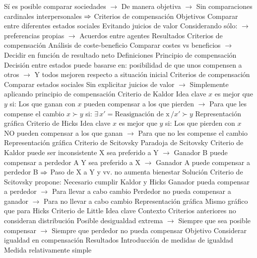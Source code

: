 \documentclass{nuevotema}
\begin{document}
\begin{esquemal}
				\4[] Sí es posible comparar sociedades
				\4[] $\to$ De manera objetiva
				\4[] $\to$ Sin comparaciones cardinales interpersonales
				\4[] $\Rightarrow$ Criterios de compensación
			\3 Objetivos
				\4 Comparar entre diferentes estados sociales
				\4 Evitando juicios de valor
				\4[] Considerando sólo:
				\4[] $\to$ preferencias propias
				\4[] $\to$ Acuerdos entre agentes
			\3 Resultados
				\4 Criterios de compensación
				\4 Análisis de coste-beneficio
				\4[] Comparar costes vs beneficios
				\4[] $\to$ Decidir en función de resultado neto
		\2 Definiciones
			\3 Principio de compensación
				\4 Decisión entre estados puede basarse en:
				\4[] posibilidad de que unos compensen a otros
				\4[] $\to$ Y todos mejoren respecto a situación inicial
			\3 Criterios de compensación
				\4 Comparar estados sociales
				\4[] Sin explicitar juicios de valor
				\4[] $\to$ Simplemente aplicando principio de compensación
		\2 Criterio de Kaldor
			\3 Idea clave
				\4 $x$ es mejor que $y$ si:
				\4[] Los que ganan con $x$
				\4[] pueden compensar a los que pierden
				\4[] $\to$ Para que les compense el cambio
				\4 $x \succ y$ si:
				\4[] $\exists \, x' = \textrm{Reasignación de x} \, / x' \succ y$
			\3 Representación gráfica
				\4[] 
		\2 Criterio de Hicks
			\3 Idea clave
				\4 $x$ es mejor que $y$ si:
				\4[] Los que pierden con $x$
				\4[] NO pueden compensar a los que ganan
				\4[] $\to$ Para que no les compense el cambio
			\3 Representación gráfica
				\4[] 
		\2 Criterio de Scitovsky
			\3 Paradoja de Scitovsky
				\4 Criterio de Kaldor puede ser inconsistente
				\4[] X sea preferido a Y
				\4[] $\to$ Ganador B puede compensar a perdedor A
				\4[] Y sea preferido a X
				\4[] $\to$ Ganador A puede compensar a perdedor B
				\4[] $\Rightarrow$ Paso de X a Y y vv. no aumenta bienestar
			\3 Solución
				\4 Criterio de Scitovsky propone:
				\4[] Necesario cumplir Kaldor y Hicks
				\4[] Ganador pueda compensar a perdedor
				\4[] $\to$ Para llevar a cabo cambio
				\4[] Perdedor no pueda compensar a ganador
				\4[] $\to$ Para no llevar a cabo cambio
			\3 Representación gráfica
				\4 Mismo gráfico que para Hicks
		\2 Criterio de Little
			\3 Idea clave
				\4 Contexto
				\4[] Criterios anteriores no consideran distribución
				\4[] Posible desigualdad extrema
				\4[] $\to$ Siempre que sea posible compensar
				\4[] $\to$ Siempre que perdedor no pueda compensar
				\4 Objetivo
				\4[] Considerar igualdad en compensación
				\4 Resultados
				\4[] Introducción de medidas de igualdad
				\4[] Medida relativamente simple

\end{esquemal}
\end{document}

